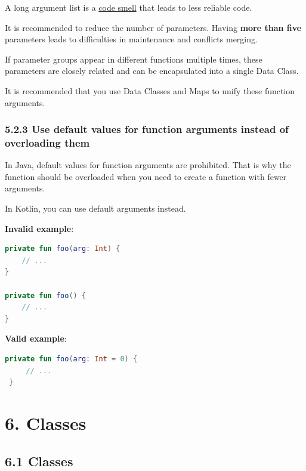 {{{{\label{sec:5.2.2}



A long argument list is a \href{https://en.wikipedia.org/wiki/Code_smell}{code smell} that leads to less reliable code.

It is recommended to reduce the number of parameters. Having \textbf{more than five} parameters leads to difficulties in maintenance and conflicts merging.

If parameter groups appear in different functions multiple times, these parameters are closely related and can be encapsulated into a single Data Class.

It is recommended that you use Data Classes and Maps to unify these function arguments.



\subsubsection*{\textbf{5.2.3 Use default values for function arguments instead of overloading them}}
\leavevmode\newline

\label{sec:5.2.3}

In Java, default values for function arguments are prohibited. That is why the function should be overloaded when you need to create a function with fewer arguments.

In Kotlin, you can use default arguments instead.



\textbf{Invalid example}:

\begin{lstlisting}[language=Kotlin]
private fun foo(arg: Int) {
    // ...
}

private fun foo() {
    // ...
}
\end{lstlisting}


\textbf{Valid example}:

\begin{lstlisting}[language=Kotlin]
 private fun foo(arg: Int = 0) {
     // ...
 }
\end{lstlisting}
\section*{\textbf{6. Classes}}

\label{sec:6.}

\subsection*{\textbf{6.1 Classes}}

}}}}
